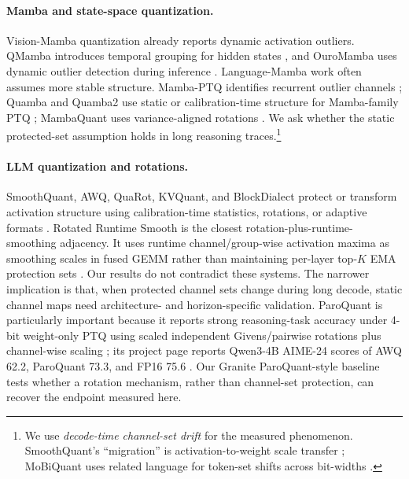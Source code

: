 \documentclass{article}
\begin{document}
\paragraph{Mamba and state-space quantization.} Vision-Mamba quantization already reports dynamic activation outliers. QMamba introduces temporal grouping for hidden states \citep{li2025qmamba}, and OuroMamba uses dynamic outlier detection during inference \citep{ramachandran2025ouromamba}. Language-Mamba work often assumes more stable structure. Mamba-PTQ identifies recurrent outlier channels \citep{pierro2024mambaptq}; Quamba and Quamba2 use static or calibration-time structure for Mamba-family PTQ \citep{chiang2024quamba,chiang2025quamba2}; MambaQuant uses variance-aligned rotations \citep{xu2025mambaquant}. We ask whether the static protected-set assumption holds in long reasoning traces.\footnote{We use \emph{decode-time channel-set drift} for the measured phenomenon. SmoothQuant's ``migration'' is activation-to-weight scale transfer \citep{xiao2023smoothquant}; MoBiQuant uses related language for token-set shifts across bit-widths \citep{wang2026mobiquant}.}

\paragraph{LLM quantization and rotations.} SmoothQuant, AWQ, QuaRot, KVQuant, and BlockDialect protect or transform activation structure using calibration-time statistics, rotations, or adaptive formats \citep{xiao2023smoothquant,lin2023awq,ashkboos2024quarot,hooper2024kvquant,jang2025blockdialect}. Rotated Runtime Smooth is the closest rotation-plus-runtime-smoothing adjacency. It uses runtime channel/group-wise activation maxima as smoothing scales in fused GEMM rather than maintaining per-layer top-$K$ EMA protection sets \citep{yi2024rrs}. Our results do not contradict these systems. The narrower implication is that, when protected channel sets change during long decode, static channel maps need architecture- and horizon-specific validation. ParoQuant is particularly important because it reports strong reasoning-task accuracy under 4-bit weight-only PTQ using scaled independent Givens/pairwise rotations plus channel-wise scaling \citep{liang2026paroquant}; its project page reports Qwen3-4B AIME-24 scores of AWQ 62.2, ParoQuant 73.3, and FP16 75.6 \citep{zlab2026paroquantproject}. Our Granite ParoQuant-style baseline tests whether a rotation mechanism, rather than channel-set protection, can recover the endpoint measured here.
\end{document}
